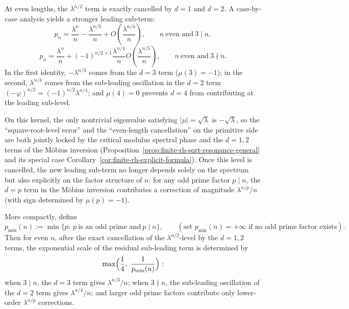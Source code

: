 \begin{remark}\label{rem:finite-rh-even-strengthen}
At even lengths, the $\lambda^{n/2}$ term is exactly cancelled by $d=1$ and $d=2$. A case-by-case analysis yields a stronger leading sub-term:
\[
p_n=\frac{\lambda^n}{n}-\frac{\lambda^{n/3}}{n}+O\!\left(\frac{\lambda^{n/4}}{n}\right),
\qquad n\ \text{even and}\ 3\mid n,
\]
\[
p_n=\frac{\lambda^n}{n}+(-1)^{n/2+1}\frac{\lambda^{n/4}}{n}
O\!\left(\frac{\lambda^{n/5}}{n}\right),
\qquad n\ \text{even and}\ 3\nmid n.
\]
In the first identity, $-\lambda^{n/3}$ comes from the $d=3$ term ($\mu(3)=-1$); in the second, $\lambda^{n/4}$ comes from the sub-leading oscillation in the $d=2$ term
$(-\varphi)^{n/2}=(-1)^{n/2}\lambda^{n/4}$; and $\mu(4)=0$ prevents $d=4$ from contributing at the leading sub-level.
\end{remark}

\begin{remark}\label{rem:finite-rh-factor-controls-secondary}
On this kernel, the only nontrivial eigenvalue satisfying $|\mu|=\sqrt{\lambda}$ is $-\sqrt{\lambda}$, so the ``square-root-level error'' and the ``even-length cancellation'' on the primitive side are both jointly locked by the critical modulus spectral phase and the $d=1,2$ terms of the M\"obius inversion (Proposition~\ref{prop:finite-rh-sqrt-resonance-general} and its special case Corollary~\ref{cor:finite-rh-explicit-formula}).
Once this level is cancelled, the new leading sub-term no longer depends solely on the spectrum but also explicitly on the factor structure of $n$: for any odd prime factor $p\mid n$, the $d=p$ term in the M\"obius inversion contributes a correction of magnitude $\lambda^{n/p}/n$ (with sign determined by $\mu(p)=-1$).
\par
More compactly, define
\[
p_{\min}(n):=\min\{p:\ p\ \text{is an odd prime and}\ p\mid n\},
\qquad(\text{set }p_{\min}(n)=+\infty\text{ if no odd prime factor exists}).
\]
Then for even $n$, after the exact cancellation of the $\lambda^{n/2}$-level by the $d=1,2$ terms, the exponential scale of the residual sub-leading term is determined by
\[
\max\Bigl(\frac14,\ \frac{1}{p_{\min}(n)}\Bigr):
\]
when $3\mid n$, the $d=3$ term gives $\lambda^{n/3}/n$; when $3\nmid n$, the sub-leading oscillation of the $d=2$ term gives $\lambda^{n/4}/n$; and larger odd prime factors contribute only lower-order $\lambda^{n/p}$ corrections.
\end{remark}

